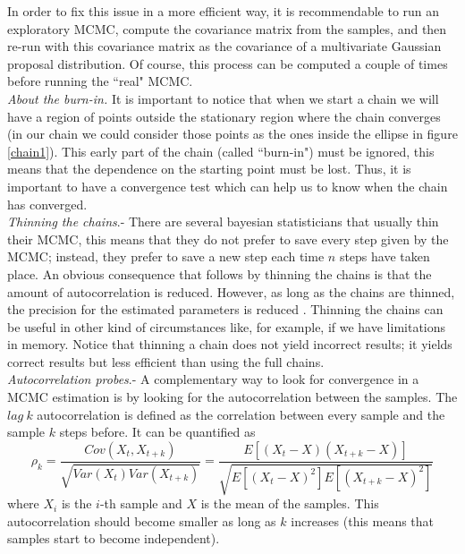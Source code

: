 \documentclass[onecolumn,           %
               showpacs,            %
               preprintnumbers,     %
               aps,                 %
               letterpaper,             %
               superscriptaddress,      %
               nofootinbib,         %
               tightenlines,        %
               floats,floatfix      %
               ,usenatbib,
               ]{revtex4-1}
\begin{document}
In order to fix this issue in a more efficient way, it is recommendable to run an exploratory MCMC, compute the covariance matrix from the samples, and then re-run with this covariance matrix as the covariance of a multivariate Gaussian proposal distribution. Of course, this process can be computed a couple of times before running the ``real" MCMC.\\

\textit{About the burn-in.} It is important to notice that when we start a chain we will have a region of points outside the stationary region where the chain converges (in our chain we could consider those points as the ones inside the ellipse in figure \ref{chain1}). This early part of the chain (called ``burn-in") must be ignored, this means that the dependence on the starting point must be lost. Thus, it is important to have a convergence test which can help us to know when the chain has converged.\\

 \textit{Thinning the chains}.- There are several bayesian statisticians that usually thin their MCMC, this means that they do not prefer to save every step given by the MCMC; instead, they prefer to save a new step each time $n$ steps have taken place. An obvious consequence that follows by thinning the chains is that the amount of autocorrelation is reduced. However, as long as the chains are thinned, the precision for the estimated parameters is reduced \cite{thin}. Thinning the chains can be useful in other kind of circumstances like, for example, if we have limitations in memory. Notice that thinning a chain does not yield incorrect results; it yields correct results but less efficient than using the full chains.       
\\

\textit{Autocorrelation probes}.- A complementary way to look for convergence in a MCMC estimation is by looking for the autocorrelation between the samples. The $lag\ k$ autocorrelation is defined as the correlation between every sample and the sample $k$ steps before. It can be quantified as \cite{autocor}
\begin{equation}
\rho_k=\frac{Cov(X_t,X_{t+k})}{\sqrt{Var(X_t)Var(X_{t+k})}}=\frac{E[(X_t-X)(X_{t+k}-X)]}{\sqrt{E[(X_t-X)^2]E[(X_{t+k}-X)^2]}}
\end{equation}
where $X_i$ is the $i$-th sample and $X$ is the mean of the samples. This autocorrelation should become smaller as long as $k$ increases (this means that samples start to become independent).\\
\end{document}
